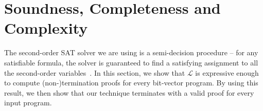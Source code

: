 \documentclass[a4paper]{llncs}
\newcommand{\newC}{C$^-$\xspace}
\newcommand*\Let[2]{\State #1 $\gets$ #2}
\begin{document}









\section{Soundness, Completeness and Complexity}
The second-order SAT solver we are using is a semi-decision procedure -- for any
satisfiable formula, the solver is guaranteed to find a satisfying assignment to
all the second-order variables~\cite{kalashnikov}. 
In this section, we show that $\mathcal{L}$ is expressive enough
to compute (non-)termination proofs for every bit-vector program.
By using this result, %
we then show that our technique terminates with a valid proof for every input program.
\end{document}

